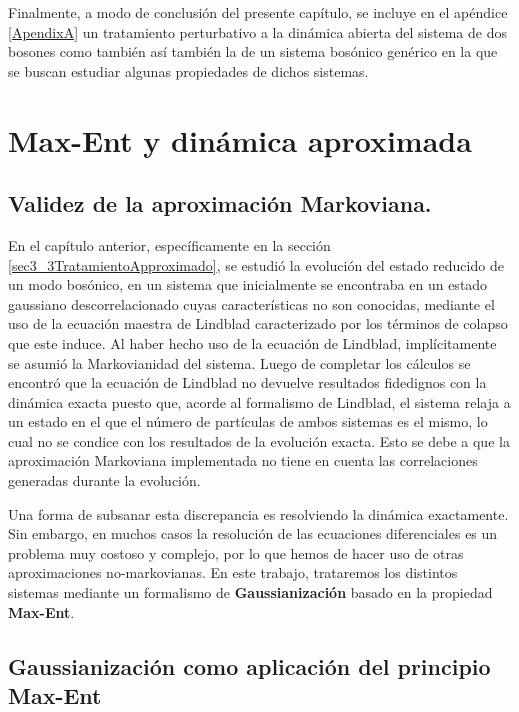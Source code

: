 \documentclass{report} %
\numberwithin{equation}{section}
\begin{document}
Finalmente, a modo de conclusión del presente capítulo, se incluye en el apéndice \ref{ApendixA} un tratamiento perturbativo a la dinámica abierta del sistema de dos bosones como también así también la de un sistema bosónico genérico en la que se buscan estudiar algunas propiedades de dichos sistemas.
\clearpage

\chapter{Max-Ent y din\'amica aproximada}
\label{chap4_allmaxent}

\section*{Validez de la aproximaci\'on Markoviana.}

En el capítulo anterior, específicamente en la sección \ref{sec3_3TratamientoApproximado}, se estudió la evolución
del estado reducido de un modo bosónico, en un sistema que inicialmente se encontraba en un estado gaussiano descorrelacionado 
cuyas caracter\'isticas no son conocidas, mediante el uso de la ecuaci\'on maestra de Lindblad 
caracterizado por los t\'erminos de colapso que este induce. 
Al haber hecho uso de la ecuación de Lindblad, implícitamente se asumió la Markovianidad del sistema. Luego de completar los cálculos se encontró que la ecuación de Lindblad no devuelve resultados fidedignos con la dinámica exacta puesto que, acorde al formalismo de Lindblad, el sistema relaja a un estado en el que el número de partículas de ambos sistemas es el mismo, lo cual no se condice con los resultados de la evolución exacta. Esto se debe a que la aproximación Markoviana implementada no tiene en cuenta las correlaciones generadas durante la evolución. 

Una forma de subsanar esta discrepancia es resolviendo la dinámica exactamente. Sin embargo, en muchos casos la resolución de las ecuaciones diferenciales es un problema muy costoso y complejo, por lo que hemos de hacer uso de otras aproximaciones no-markovianas. 
En este trabajo, trataremos los distintos sistemas mediante un formalismo de \textbf{Gaussianización} basado en la propiedad \textbf{Max-Ent}.

\section*{Gaussianizaci\'on como aplicaci\'on del principio Max-Ent}
\end{document}
